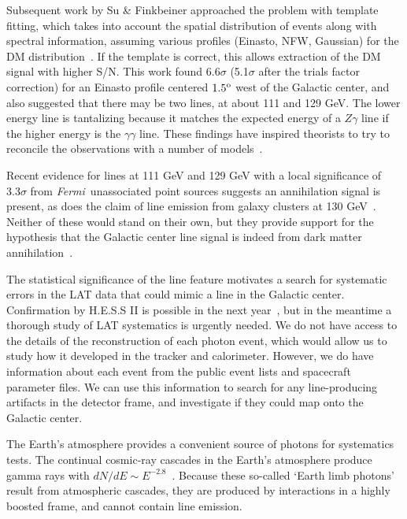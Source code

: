 \documentclass[aps,twocolumn,prd,superscriptaddress,showpacs,nofootinbib,fixfloat]{revtex4}
\newcommand{\Fermi}{{\slshape Fermi}}
\newcommand{\degree}{^{\rm o}}
\begin{document}
Subsequent work by Su \& Finkbeiner approached the problem
with template fitting, which takes into account the spatial
distribution of events along with spectral information,
assuming various profiles (Einasto, NFW, Gaussian) for the
DM distribution~\citep{linepaper}.  If the template is
correct, this allows extraction of the DM signal with
higher S/N.  This work found 6.6$\sigma$ (5.1$\sigma$ after
the trials factor correction) for an Einasto profile
centered $1.5\degree$ west of the Galactic center, and also
suggested that there may be two lines, at about 111 and 129
GeV.  The lower energy line is tantalizing because it
matches the expected energy of a $Z\gamma$ line if the
higher energy is the $\gamma\gamma$ line.  These findings
have inspired theorists to try to reconcile the observations
with a number of models~\citep{Dudas:2012, Choi:2012,
  Kyae:2012, Lee:2012, Rajaraman:2012, Acharya:2012,
  Garny:2012, Buckley:2012, Chu:2012, Kang:2012,
  Buchmuller:2012, Heo:2012, Park:2012, Tulin:2012,
  Cline:2012, Weiner:2012}.

Recent evidence for lines at 111 GeV and 129 GeV with a
local significance of $3.3\sigma$ from \Fermi\ unassociated
point sources suggests an annihilation signal is present, as
does the claim of line emission from galaxy clusters at 130
GeV~\cite{Hektor:2012kc}.  Neither of these would stand on
their own, but they provide support for the hypothesis that
the Galactic center line signal is indeed from dark matter
annihilation~\cite{doubleline}.

The statistical significance of the line
feature motivates a search for systematic errors in the
LAT data that could mimic a line in the Galactic center.
Confirmation by H.E.S.S II is possible in the next
year~\cite{Bergstrom:2012}, but in the meantime a thorough
study of LAT systematics is urgently needed.  We do not have
access to the details of the reconstruction of each photon
event, which would allow us to study how it developed in the
tracker and calorimeter.  However, we do have information
about each event from the public event lists and spacecraft
parameter files.  We can use this information to search for
any line-producing artifacts in the detector frame, and
investigate if they could map onto the Galactic center.

The Earth's atmosphere provides a convenient source of photons for systematics
tests.  The continual cosmic-ray cascades in the Earth's atmosphere
produce gamma rays with $dN/dE \sim
E^{-2.8}$~\citep{FermiLimb}.  Because these so-called `Earth limb photons'
result from atmospheric cascades, they are produced by
interactions in a highly boosted frame, and cannot contain
line emission.  
\medskip
\end{document}
